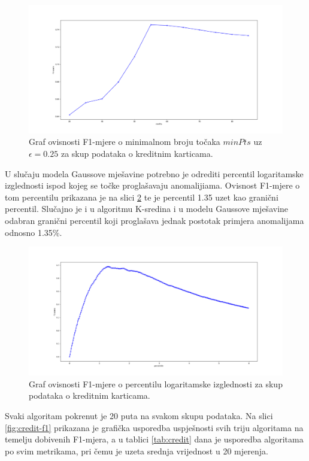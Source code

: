 \documentclass[utf8, diplomski, numeric]{fer}
\begin{document}
\begin{figure}[htb]
\includegraphics[width=1\textwidth]{images/credit-dbscan-f1.png}
\centering
\caption{Graf ovisnosti F1-mjere o minimalnom broju točaka $minPts$ uz $\epsilon = 0.25$ za skup podataka o kreditnim karticama.}
\label{fig:credit-dbscan}
\end{figure}

U slučaju modela Gaussove mješavine potrebno je odrediti percentil logaritamske izglednosti ispod kojeg se točke proglašavaju anomalijiama. Ovisnost F1-mjere o tom percentilu prikazana je na slici \ref{fig:credit-gauss} te je percentil 1.35 uzet kao granični percentil. Slučajno je i u algoritmu K-sredina i u modelu Gaussove mješavine odabran granični percentil koji proglašava jednak postotak primjera anomalijama odnosno 1.35\%.

\begin{figure}[h!]
\includegraphics[width=1\textwidth]{images/credit-gauss-f1.png}
\centering
\caption{Graf ovisnosti F1-mjere o percentilu logaritamske izglednosti za skup podataka o kreditnim karticama.}
\label{fig:credit-gauss}
\end{figure}

Svaki algoritam pokrenut je 20 puta na svakom skupu podataka. Na slici \ref{fig:credit-f1} prikazana je grafička usporedba uspješnosti svih triju algoritama na temelju dobivenih F1-mjera, a u tablici \ref{tab:credit} dana je usporedba algoritama po svim metrikama, pri čemu je uzeta srednja vrijednost u 20 mjerenja.
\end{document}
